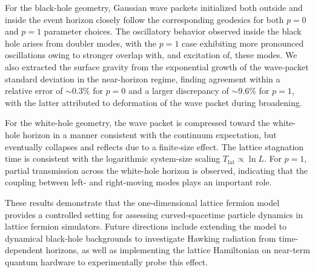 \documentclass[reprint,amsmath,amssymb,aps,showkeys,superscriptaddress]{revtex4-2}
\begin{document}
For the black-hole geometry, Gaussian wave packets initialized both outside and inside the event horizon closely follow the corresponding geodesics for both $p=0$ and $p=1$ parameter choices. The oscillatory behavior observed inside the black hole arises from doubler modes, with the $p=1$ case exhibiting more pronounced oscillations owing to stronger overlap with, and excitation of, these modes. We also extracted the surface gravity from the exponential growth of the wave-packet standard deviation in the near-horizon regime, finding agreement within a relative error of $\sim 0.3\%$ for $p=0$ and a larger discrepancy of $\sim 9.6\%$ for $p=1$, with the latter attributed to deformation of the wave packet during broadening.

For the white-hole geometry, the wave packet is compressed toward the white-hole horizon in a manner consistent with the continuum expectation, but eventually collapses and reflects due to a finite-size effect. The lattice stagnation time is consistent with the logarithmic system-size scaling $T_{\mathrm{lat}}\propto\ln L$. For $p=1$, partial transmission across the white-hole horizon is observed, indicating that the coupling between left- and right-moving modes plays an important role.

These results demonstrate that the one-dimensional lattice fermion model provides a controlled setting for assessing curved-spacetime particle dynamics in lattice fermion simulators. Future directions include extending the model to dynamical black-hole backgrounds to investigate Hawking radiation from time-dependent horizons, as well as implementing the lattice Hamiltonian on near-term quantum hardware to experimentally probe this effect.


\end{document}
